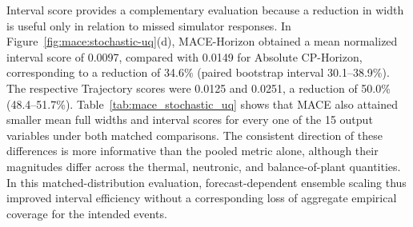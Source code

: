 Interval score provides a complementary evaluation because a reduction in width is useful only in relation to missed simulator responses. In Figure~\ref{fig:mace:stochastic-uq}(d), MACE-Horizon obtained a mean normalized interval score of 0.0097, compared with 0.0149 for Absolute CP-Horizon, corresponding to a reduction of 34.6\% (paired bootstrap interval 30.1--38.9\%). The respective Trajectory scores were 0.0125 and 0.0251, a reduction of 50.0\% (48.4--51.7\%). Table~\ref{tab:mace_stochastic_uq} shows that MACE also attained smaller mean full widths and interval scores for every one of the 15 output variables under both matched comparisons. The consistent direction of these differences is more informative than the pooled metric alone, although their magnitudes differ across the thermal, neutronic, and balance-of-plant quantities. In this matched-distribution evaluation, forecast-dependent ensemble scaling thus improved interval efficiency without a corresponding loss of aggregate empirical coverage for the intended events.

